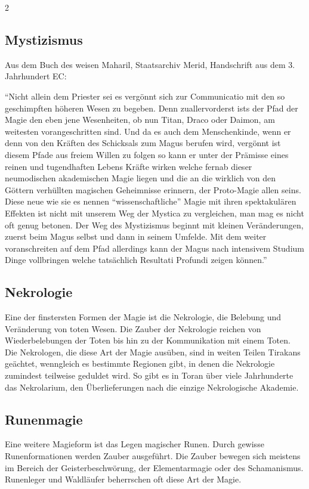 \begin{multicols}{2}
{\subsection{Mystizismus}
Aus dem Buch des weisen Maharil, Staatsarchiv Merid, Handschrift aus dem 3. Jahrhundert EC:

``Nicht allein dem Priester sei es vergönnt sich zur Communicatio mit den so geschimpften höheren Wesen zu begeben.
Denn zuallervorderst ists der Pfad der Magie den eben jene Wesenheiten, ob nun Titan, Draco oder Daimon, am weitesten vorangeschritten sind.
Und da es auch dem Menschenkinde, wenn er denn von den Kräften des Schicksals zum Magus berufen wird, vergönnt ist diesem Pfade aus freiem Willen zu folgen so kann er unter der Prämisse eines reinen und tugendhaften Lebens Kräfte wirken welche fernab dieser neumodischen akademischen Magie liegen und die an die wirklich von den Göttern verhüllten magischen Geheimnisse erinnern, der Proto-Magie allen seins.
Diese neue wie sie es nennen “wissenschaftliche” Magie mit ihren spektakulären Effekten ist nicht mit unserem Weg der Mystica zu vergleichen, man mag es nicht oft genug betonen.
Der Weg des Mystizismus beginnt mit kleinen Veränderungen, zuerst beim Magus selbst und dann in seinem Umfelde.
Mit dem weiter voranschreiten auf dem Pfad allerdings kann der Magus nach intensivem Studium Dinge vollbringen welche tatsächlich Resultati Profundi zeigen können.''

\subsection{Nekrologie}\label{subsec:nekrologie}

Eine der finstersten Formen der Magie ist die Nekrologie, die Belebung und Veränderung von toten Wesen.
Die Zauber der Nekrologie reichen von Wiederbelebungen der Toten bis hin zu der Kommunikation mit einem Toten.
Die Nekrologen, die diese Art der Magie ausüben, sind in weiten Teilen Tirakans geächtet, wenngleich es bestimmte Regionen gibt, in denen die Nekrologie zumindest teilweise geduldet wird.
So gibt es in Toran über viele Jahrhunderte das Nekrolarium, den Überlieferungen nach die einzige Nekrologische Akademie.

\subsection{Runenmagie}\label{subsec:runenmagie}

Eine weitere Magieform ist das Legen magischer Runen.
Durch gewisse Runenformationen werden Zauber ausgeführt.
Die Zauber bewegen sich meistens im Bereich der Geisterbeschwörung, der Elementarmagie oder des Schamanismus.
Runenleger und Waldläufer beherrschen oft diese Art der Magie.

}
\end{multicols}
